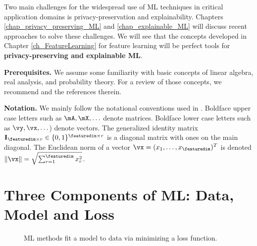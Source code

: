 \documentclass[12pt]{report}
\begin{document}
Two main challenges for the widespread use of ML techniques 
in critical application domains is privacy-preservation and 
explainability. Chapters \ref{chap_privacy_preserving_ML} 
and \ref{chap_explainable_ML} will discuss recent approaches 
to solve these challenges. We will see that the concepts 
developed in Chapter \ref{ch_FeatureLearning} for feature 
learning will be perfect tools for {\bf privacy-preserving and 
explainable ML}. 

{\bf Prerequisites.} We assume some familiarity with basic concepts 
of linear algebra, real analysis, and probability theory. For a review of 
those concepts, we recommend \cite[Chapter 2-4]{Goodfellow-et-al-2016} 
and the references therein. 

{\bf Notation.} We mainly follow the notational conventions used 
in \cite{Goodfellow-et-al-2016}. Boldface upper case letters such 
as $\mA,\mX,\ldots$ denote matrices. Boldface lower case letters 
such as $\vy,\vx,\ldots$) denote vectors. The generalized identity 
matrix $\mathbf{I}_{\featuredim \times r} \in \{0,1\}^{\featuredim \times r}$ 
is a diagonal matrix with ones on the main diagonal. The Euclidean 
norm of a vector $\vx=(x_{1},\ldots,x_{\featuredim})^{T}$ is denoted 
$\| \vx \| = \sqrt{ \sum_{r=1}^{\featuredim} x^{2}_{r}}$. 

\newpage
\chapter{Three Components of ML: Data, Model and Loss} 
\label{ch_Elements_ML}

\begin{figure}[htbp]
	\begin{center}
		
	\end{center} 
	\caption{ML methods fit a model to data via minimizing a loss function.}
	\label{fig_ml_problem}
\end{figure}
\end{document}
